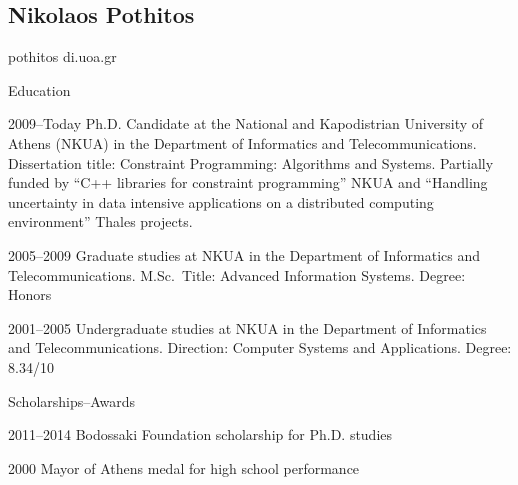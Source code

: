 \documentclass[a4paper]{article}
\begin{document}
\begin{cv}{}

\begin{center}
  \section*{Nikolaos Pothitos}
  pothitos di.uoa.gr
\end{center}

\begin{cvlist}{Education}
  \item[2009--Today] Ph.D. Candidate at the National and
                     Kapodistrian University of Athens
                     (NKUA) in the Department of Informatics
                     and Telecommunications. Dissertation
                     title: \textsf{Constraint Programming:
                     Algorithms and Systems}. Partially
                     funded by ``C++ libraries for
                     constraint programming'' NKUA and
                     ``Handling uncertainty in data
                     intensive applications on a distributed
                     computing environment'' Thales
                     projects.
  \item[2005--2009] Graduate studies at NKUA in the
                    Department of Informatics and
                    Telecommunications. M.Sc.\ Title:
                    \textsf{Advanced Information Systems}.
                    Degree: Honors
  \item[2001--2005] Undergraduate studies at NKUA in the
                    Department of Informatics and
                    Telecommunications. Direction:
                    \textsf{Computer Systems and
                    Applications}. Degree: 8.34/10
\end{cvlist}

\begin{cvlist}{Scholarships--Awards}
  \item[2011--2014] Bodossaki Foundation scholarship for
                    Ph.D. studies
  \item[2000] Mayor of Athens medal for high school
              performance
\end{cvlist}

\vspace{1em}

\nocite{*}




\end{cv}
\end{document}

